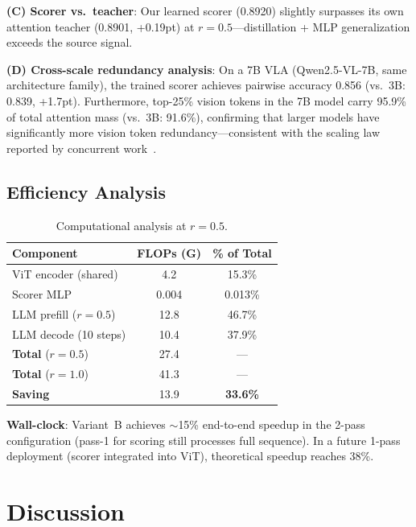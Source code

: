 \documentclass[letterpaper]{article} %
\begin{document}
\textbf{(C) Scorer vs.\ teacher}:
Our learned scorer (0.8920) slightly surpasses its own attention teacher (0.8901, +0.19pt) at $r{=}0.5$---distillation + MLP generalization exceeds the source signal.

\textbf{(D) Cross-scale redundancy analysis}:
On a 7B VLA (Qwen2.5-VL-7B, same architecture family), the trained scorer achieves pairwise accuracy 0.856 (vs.\ 3B: 0.839, +1.7pt).
Furthermore, top-25\% vision tokens in the 7B model carry 95.9\% of total attention mass (vs.\ 3B: 91.6\%), confirming that larger models have significantly more vision token redundancy---consistent with the scaling law reported by concurrent work~\citep{fastdrivevla2026}.

\subsection{Efficiency Analysis}

\begin{table}[t]
\centering
\caption{Computational analysis at $r{=}0.5$.}
\label{tab:efficiency}
\small
\begin{tabular}{lcc}
\toprule
\textbf{Component} & \textbf{FLOPs (G)} & \textbf{\% of Total} \\
\midrule
ViT encoder (shared) & 4.2 & 15.3\% \\
Scorer MLP & 0.004 & 0.013\% \\
LLM prefill ($r{=}0.5$) & 12.8 & 46.7\% \\
LLM decode (10 steps) & 10.4 & 37.9\% \\
\midrule
\textbf{Total} ($r{=}0.5$) & 27.4 & --- \\
\textbf{Total} ($r{=}1.0$) & 41.3 & --- \\
\textbf{Saving} & 13.9 & \textbf{33.6\%} \\
\bottomrule
\end{tabular}
\end{table}

\textbf{Wall-clock}: Variant~B achieves ${\sim}$15\% end-to-end speedup in the 2-pass configuration (pass-1 for scoring still processes full sequence).
In a future 1-pass deployment (scorer integrated into ViT), theoretical speedup reaches 38\%.

\section{Discussion}
\label{sec:discussion}
\end{document}
